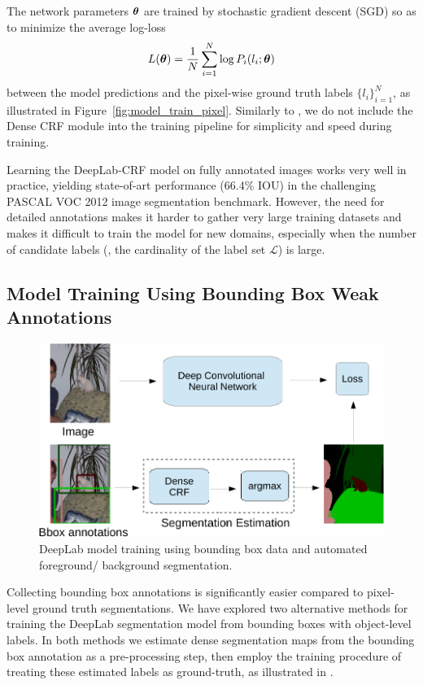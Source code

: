 The network parameters $\boldsymbol{\theta}$ are trained by stochastic gradient
descent (SGD) so as to minimize the average log-loss 
\begin{equation}
  \label{eq:log_loss}
  L(\boldsymbol{\theta}) = \frac{1}{N} \sum_{i = 1}^N \log P_i(l_i; \boldsymbol{\theta})
\end{equation}
between the model predictions and the pixel-wise ground truth
labels $\{l_i\}_{i = 1}^N$, as illustrated in
Figure~\ref{fig:model_train_pixel}. Similarly to
\citet{chen2014semantic}, we do not include the Dense CRF module into
the training pipeline for simplicity and speed during training.

Learning the DeepLab-CRF model on fully annotated images works very
well in practice, yielding state-of-art performance (66.4\% IOU) in
the challenging PASCAL VOC 2012 image segmentation benchmark. However,
the need for detailed annotations makes it harder to gather very
large training datasets and makes it difficult to train the model
for new domains, especially when the number of candidate labels
(\ie, the cardinality of the label set $\mathcal{L}$) is large.

\subsection{Model Training Using Bounding Box Weak Annotations}
\label{sec:train_bbox}

\begin{figure}[tbp!]
  \centering
  \includegraphics[width=0.9\linewidth]{fig/model_train_bbox.pdf} 
  \caption{DeepLab model training using bounding box data and
    automated foreground/ background segmentation.}
  \label{fig:model_train_bbox}
\end{figure}

Collecting bounding box annotations is significantly easier compared
to pixel-level ground truth segmentations. We have explored two
alternative methods for training the DeepLab segmentation model from
bounding boxes with object-level labels. In both methods we estimate
dense segmentation maps from the bounding box annotation as a
pre-processing step, then employ the training procedure of
 treating these estimated labels as
ground-truth, as illustrated in .

